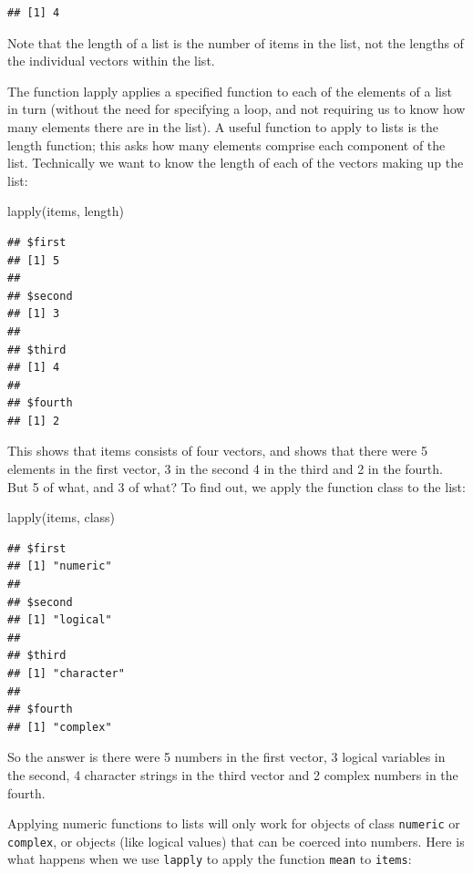 \documentclass[
]{book}
\newenvironment{Shaded}{\begin{snugshade}}{\end{snugshade}}
\newcommand{\FunctionTok}[1]{\textcolor[rgb]{0.00,0.00,0.00}{#1}}
\newcommand{\NormalTok}[1]{#1}
\begin{document}
\begin{verbatim}
## [1] 4
\end{verbatim}

Note that the length of a list is the number of items in the list, not the lengths of the individual vectors within the list.

The function lapply applies a specified function to each of the elements of a list in turn (without the need for specifying a loop, and not requiring us to know how many elements there are in the list). A useful function to apply to lists is the length function; this asks how many elements comprise each component of the list. Technically we want to know the length of each of the vectors making up the list:

\begin{Shaded}
\begin{Highlighting}[]
\FunctionTok{lapply}\NormalTok{(items, length)}
\end{Highlighting}
\end{Shaded}

\begin{verbatim}
## $first
## [1] 5
## 
## $second
## [1] 3
## 
## $third
## [1] 4
## 
## $fourth
## [1] 2
\end{verbatim}

This shows that items consists of four vectors, and shows that there were 5 elements in the first vector, 3 in the second 4 in the third and 2 in the fourth. But 5 of what, and 3 of what? To find out, we apply the function class to the list:

\begin{Shaded}
\begin{Highlighting}[]
\FunctionTok{lapply}\NormalTok{(items, class)}
\end{Highlighting}
\end{Shaded}

\begin{verbatim}
## $first
## [1] "numeric"
## 
## $second
## [1] "logical"
## 
## $third
## [1] "character"
## 
## $fourth
## [1] "complex"
\end{verbatim}

So the answer is there were 5 numbers in the first vector, 3 logical variables in the second, 4 character strings in the third vector and 2 complex numbers in the fourth.

Applying numeric functions to lists will only work for objects of class \texttt{numeric} or \texttt{complex}, or objects (like logical values) that can be coerced into numbers. Here is what happens when we use \texttt{lapply} to apply the function \texttt{mean} to \texttt{items}:
\end{document}
